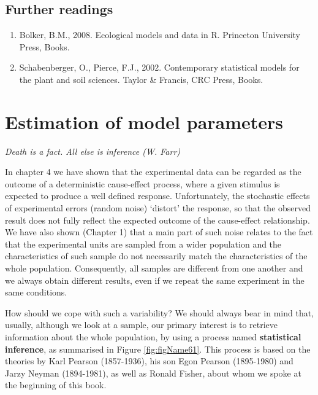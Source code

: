 \documentclass[a4paper,12pt,oneside]{book}
\providecommand{\tightlist}{%
  \setlength{\itemsep}{0pt}\setlength{\parskip}{0pt}}
\begin{document}
\hypertarget{further-readings-2}{%
\section{Further readings}\label{further-readings-2}}

\begin{enumerate}
\def\labelenumi{\arabic{enumi}.}
\tightlist
\item
  Bolker, B.M., 2008. Ecological models and data in R. Princeton University Press, Books.
\item
  Schabenberger, O., Pierce, F.J., 2002. Contemporary statistical models for the plant and soil sciences. Taylor \& Francis, CRC Press, Books.
\end{enumerate}

\hypertarget{estimation-of-model-parameters}{%
\chapter{Estimation of model parameters}\label{estimation-of-model-parameters}}

\emph{Death is a fact. All else is inference (W. Farr)}

In chapter 4 we have shown that the experimental data can be regarded as the outcome of a deterministic cause-effect process, where a given stimulus is expected to produce a well defined response. Unfortunately, the stochastic effects of experimental errors (random noise) `distort' the response, so that the observed result does not fully reflect the expected outcome of the cause-effect relationship. We have also shown (Chapter 1) that a main part of such noise relates to the fact that the experimental units are sampled from a wider population and the characteristics of such sample do not necessarily match the characteristics of the whole population. Consequently, all samples are different from one another and we always obtain different results, even if we repeat the same experiment in the same conditions.

How should we cope with such a variability? We should always bear in mind that, usually, although we look at a sample, our primary interest is to retrieve information about the whole population, by using a process named \textbf{statistical inference}, as summarised in Figure \ref{fig:figName61}. This process is based on the theories by Karl Pearson (1857-1936), his son Egon Pearson (1895-1980) and Jarzy Neyman (1894-1981), as well as Ronald Fisher, about whom we spoke at the beginning of this book.
\end{document}

